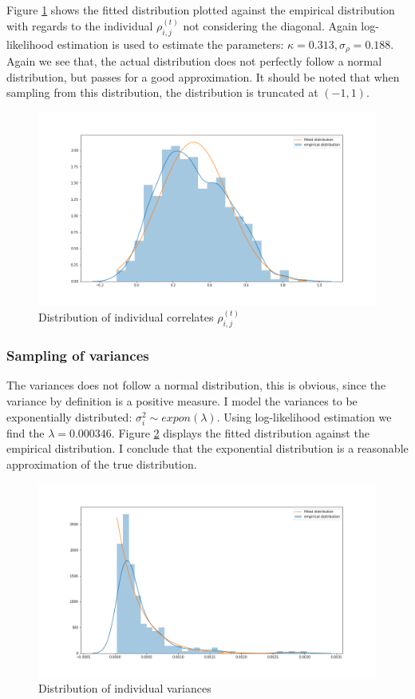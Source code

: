 Figure \ref{fig:distcorrs} shows the fitted distribution plotted against the empirical distribution with regards to the individual $\rho_{i,j}^{(t)}$ not considering the diagonal. Again log-likelihood estimation is used to estimate the parameters: $\kappa=0.313, \sigma_\rho=0.188$. Again we see that, the actual distribution does not perfectly follow a normal distribution, but passes for a good approximation. It should be noted that when sampling from this distribution, the distribution is truncated at $(-1, 1)$.

\begin{figure}[ht]
\centering
\includegraphics[scale=0.3]{figures/correlation_distribution.png}
\caption{Distribution of individual correlates $\rho_{i,j}^{(t)}$}
\label{fig:distcorrs}
\end{figure}

\subsubsection{Sampling of variances}

The variances does not follow a normal distribution, this is obvious, since the variance by definition is a positive measure. I model the variances to be exponentially distributed: $\sigma^2_{i} \sim expon(\lambda)$. Using log-likelihood estimation we find the $\lambda=0.000346$. Figure \ref{fig:distvars} displays the fitted distribution against the empirical distribution. I conclude that the exponential distribution is a reasonable approximation of the true distribution.

\begin{figure}[ht]
\centering
\includegraphics[scale=0.3]{figures/distribution_variances.png}
\caption{Distribution of individual variances}
\label{fig:distvars}
\end{figure}


